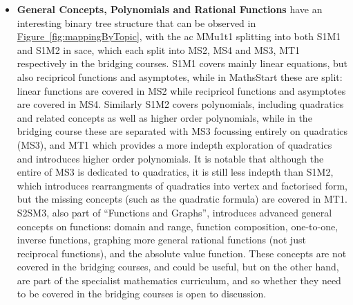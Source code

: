 \documentclass[twoside,12pt,a4paper]{report}
\newcommand{\reffig}[1]{\hyperref[fig:#1]{Figure~\ref{fig:#1}}}
\begin{document}
\begin{itemize} 
	\item \textbf{General Concepts, Polynomials and Rational Functions} have an interesting binary tree structure that can be observed in \reffig{mappingByTopic}, with the \gls{ac} MMu1t1 splitting into both S1M1 and S1M2 in \gls{sace}, which each split into MS2, MS4 and MS3, MT1 respectively in the bridging courses. S1M1 covers mainly linear equations, but also recipricol functions and asymptotes, while in MathsStart these are split: linear functions are covered in MS2 while recipricol functions and asymptotes are covered in MS4. Similarly S1M2 covers polynomials, including quadratics and related concepts as well as higher order polynomials, while in the bridging course these are separated with MS3 focussing entirely on quadratics (MS3), and MT1 which provides a more indepth exploration of quadratics and introduces higher order polynomials. It is notable that although the entire of MS3 is dedicated to quadratics, it is still less indepth than S1M2, which introduces rearrangments of quadratics into vertex and factorised form, but the missing concepts (such as the quadratic formula) are covered in MT1. S2SM3, also part of ``Functions and Graphs'', introduces advanced general concepts on functions: domain and range, function composition, one-to-one, inverse functions, graphing more general rational functions (not just reciprocal functions), and the absolute value function. These concepts are not covered in the bridging courses, and could be useful, but on the other hand, are part of the specialist mathematics curriculum, and so whether they need to be covered in the bridging courses is open to discussion.

\end{itemize}
\end{document}
